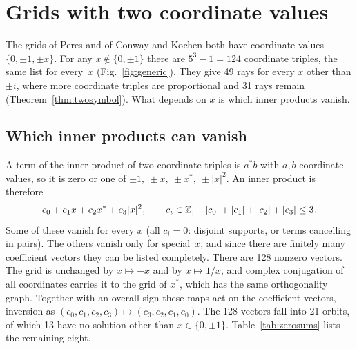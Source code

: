 \section{Grids with two coordinate values}\label{sec:real}

The grids of Peres and of Conway and Kochen both have coordinate values $\{0,\pm1,\pm x\}$.
For any $x\notin\{0,\pm1\}$ there are $5^3-1=124$ coordinate triples, the same list for every~$x$
(Fig.~\ref{fig:generic}).  They give 49 rays for every $x$ other than $\pm i$, where more
coordinate triples are proportional and 31 rays remain (Theorem~\ref{thm:twosymbol}).  What depends on $x$ is which
inner products vanish.

\subsection{Which inner products can vanish}

A term of the inner product of two coordinate triples is $a^{*}b$ with $a,b$ coordinate values, so it is zero or one of
$\pm1,\ \pm x,\ \pm x^{*},\ \pm|x|^2$.  An inner product is therefore
\[
c_0+c_1x+c_2x^{*}+c_3|x|^2,\qquad c_i\in\mathbb{Z},\quad |c_0|+|c_1|+|c_2|+|c_3|\le 3 .
\]
Some of these vanish for every $x$ (all $c_i=0$: disjoint supports, or terms cancelling in
pairs).  The others vanish only for special~$x$, and since there are finitely many coefficient
vectors they can be listed completely.  There are 128 nonzero vectors.  The grid is unchanged by
$x\mapsto-x$ and by $x\mapsto1/x$, and complex conjugation of all coordinates carries it to the
grid of $x^{*}$, which has the same orthogonality graph.  Together with an overall sign these
maps act on the coefficient vectors, inversion as
$(c_0,c_1,c_2,c_3)\mapsto(c_3,c_2,c_1,c_0)$.  The 128 vectors fall into 21 orbits, of which 13
have no solution other than $x\in\{0,\pm1\}$.  Table~\ref{tab:zerosums} lists the remaining
eight.

\begin{table}[t]
\centering
\caption{Every relation of at most three terms that can make an inner product of two coordinate triples with
coordinate values $\{0,\pm1,\pm x\}$ vanish for some but not all $x$, up to the symmetries $x\mapsto-x$,
$x\mapsto x^{*}$, $x\mapsto1/x$ and overall sign (computed by \texttt{ks\_zero\_sums\_v10.py}).
The row $x-x^{*}=0$ is the reason real grids have orthogonalities that generic complex ones
lack.
The rows $2+x=0$ and $1+2x=0$ describe the same grid, since $S$ is unchanged by $x\mapsto 1/x$.
A row says where extra orthogonalities appear; it says nothing by itself about colorability.}
\label{tab:zerosums}

\end{table}

